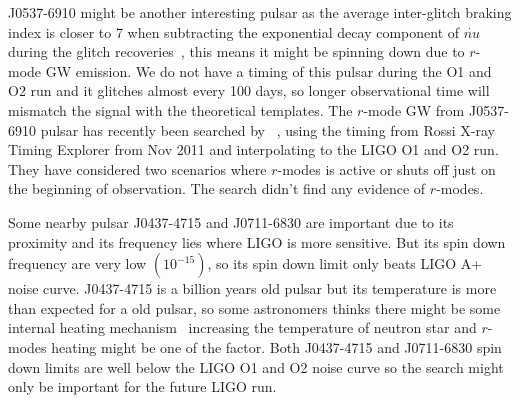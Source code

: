 \documentclass{ttuthes2007}
\begin{document}
J0537-6910 might be another interesting pulsar as the average inter-glitch
braking index is closer to 7 when subtracting the exponential decay component of
$\dot{nu}$ during the glitch recoveries~\cite{Andersson_2018,Ferdman_2018}, this
means  it might be spinning down due to $r$-mode \ac{GW} emission. We do not
have a timing of this pulsar during the \ac{O1} and \ac{O2} run and it glitches
almost every 100 days, so longer observational time will mismatch the signal
with the theoretical templates. The $r$-mode \ac{GW} from J0537-6910 pulsar has
recently been searched by ~\citet{Fesik2020}, using the timing from Rossi
X-ray Timing Explorer from Nov 2011 and interpolating to the LIGO \ac{O1} and
\ac{O2} run. They have considered two scenarios where $r$-modes is active or
shuts off just on the beginning of observation. The search didn't find any
evidence of $r$-modes.  

Some nearby pulsar J0437-4715 and J0711-6830 are important due to its proximity
and its frequency lies where \ac{LIGO} is more sensitive. But its spin down
frequency are very low $(10^{-15})$, so its spin down limit only beats LIGO A+
noise curve. J0437-4715 is a billion years old pulsar but its temperature is
more than expected for a old pulsar, so some astronomers thinks there might be
some internal heating mechanism~\cite{Durant_2012} increasing the temperature of
neutron star and $r$-modes heating might be one of the factor. Both J0437-4715
and J0711-6830 spin down limits are well below the LIGO \ac{O1} and \ac{O2}
noise curve so the search might only be important for the future LIGO run.  



\end{document}

